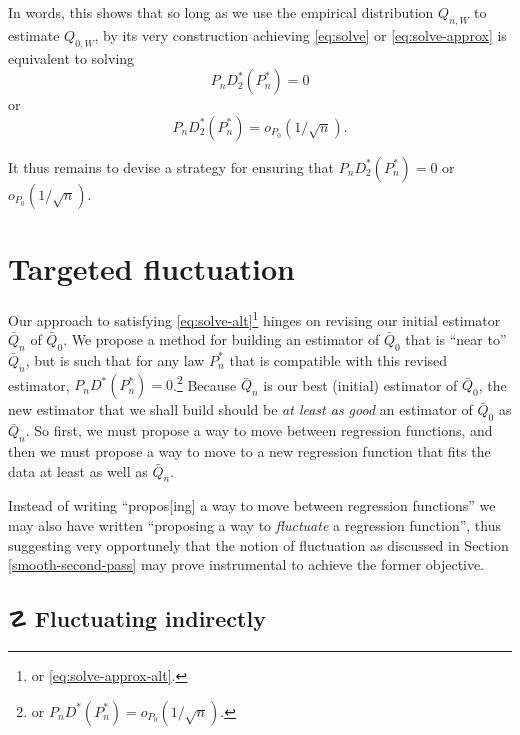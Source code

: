 \documentclass[11pt,openright,twoside]{book}
\DeclareRobustCommand{\stixdanger}{%
  {\usefont{U}{stixbbit}{m}{it}\symbol{"F6}}%
}
\newcommand{\Qbar}{\bar{Q}}
\theoremstyle{definition}
\theoremstyle{definition}
\theoremstyle{definition}
\theoremstyle{remark}
\begin{document}
In words, this shows that so long as we use the empirical distribution
\(Q_{n,W}\) to estimate \(Q_{0,W}\), by its very construction achieving
\eqref{eq:solve} or \eqref{eq:solve-approx} is equivalent to solving
\begin{equation} 
P_n  D_{2}^*(P_{n}^*)  = 0 \label{eq:solve-alt}
\end{equation}
or
\begin{equation} 
P_n D_{2}^*(P_{n}^*) = o_{P_0}(1/\sqrt{n}). \label{eq:solve-approx-alt} 
\end{equation}

It thus remains to devise a strategy for ensuring that \(P_n D_2^*(P_n^*) = 0\) or \(o_{P_0}(1/\sqrt{n})\).

\hypertarget{targeted-fluctuation-TMLE}{%
\section{Targeted fluctuation}\label{targeted-fluctuation-TMLE}}

Our approach to satisfying \eqref{eq:solve-alt}\footnote{or \eqref{eq:solve-approx-alt}.}
hinges on revising our initial estimator \(\Qbar_n\) of \(\Qbar_0\). We propose a
method for building an estimator of \(\Qbar_0\) that is ``near to'' \(\Qbar_n\), but
is such that for any law \(P_n^*\) that is compatible with this revised
estimator, \(P_n D^*(P_n^*) = 0\).\footnote{or \(P_n D^*(P_n^*) = o_{P_0}(1/\sqrt{n})\).}
Because \(\Qbar_n\) is our best (initial) estimator of \(\Qbar_0\), the new
estimator that we shall build should be \emph{at least as good} an estimator of
\(\Qbar_0\) as \(\Qbar_n\). So first, we must propose a way to move between
regression functions, and then we must propose a way to move to a new
regression function that fits the data at least as well as \(\Qbar_n\).

Instead of writing ``propos{[}ing{]} a way to move between regression functions'' we
may also have written ``proposing a way to \emph{fluctuate} a regression function'',
thus suggesting very opportunely that the notion of fluctuation as discussed
in Section \ref{smooth-second-pass} may prove instrumental to achieve the
former objective.

\hypertarget{fluctuating-indirectly}{%
\subsection{\texorpdfstring{☡ \stixdanger{} Fluctuating indirectly}{☡  Fluctuating indirectly}}\label{fluctuating-indirectly}}
\end{document}
